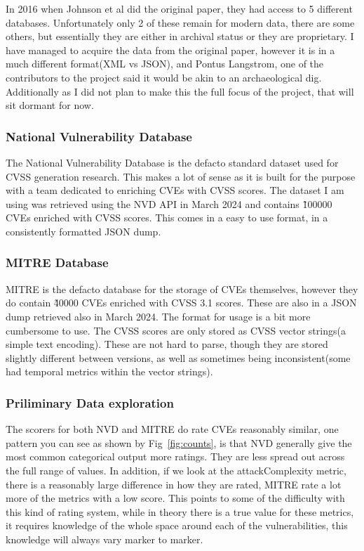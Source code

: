 \documentclass[12pt]{article}
\begin{document}
In 2016 when Johnson et al\cite{bayes} did the original paper, they had access to 5 different databases. Unfortunately only 2 of these remain for
modern data, there are some others, but essentially they are either in archival status or they are proprietary. I have managed to acquire the data
from the original paper, however it is in a much different format(XML vs JSON), and Pontus Langstrom, one of the contributors to the project said it
would be akin to an archaeological dig. Additionally as I did not plan to make this the full focus of the project, that will sit dormant for now.

\subsubsection*{National Vulnerability Database}

The National Vulnerability Database is the defacto standard dataset used for CVSS generation research. This makes a lot of sense as it is built for
the purpose with a team dedicated to enriching CVEs with CVSS scores. The dataset I am using was retrieved using the NVD API in March 2024 and
contains \~100000 CVEs enriched with CVSS scores. This comes in a easy to use format, in a consistently formatted JSON dump.

\subsubsection*{MITRE Database}

MITRE is the defacto database for the storage of CVEs themselves, however they do contain \~40000 CVEs enriched with CVSS 3.1 scores. These are also
in a JSON dump retrieved also in March 2024. The format for usage is a bit more cumbersome to use. The CVSS scores are only stored as CVSS vector
strings(a simple text encoding). These are not hard to parse, though they are stored slightly different between versions, as well as sometimes being
inconsistent(some had temporal metrics within the vector strings).

\subsubsection{Priliminary Data exploration}

The scorers for both NVD and MITRE do rate CVEs reasonably similar, one pattern you can see as shown by Fig~\ref{fig:counts}, is that NVD generally
give the most common categorical output more ratings. They are less spread out across the full range of values. In addition, if we look at the
attackComplexity metric, there is a reasonably large difference in how they are rated, MITRE rate a lot more of the metrics with a low score. This
points to some of the difficulty with this kind of rating system, while in theory there is a true value for these metrics, it requires knowledge of
the whole space around each of the vulnerabilities, this knowledge will always vary marker to marker.
\end{document}

